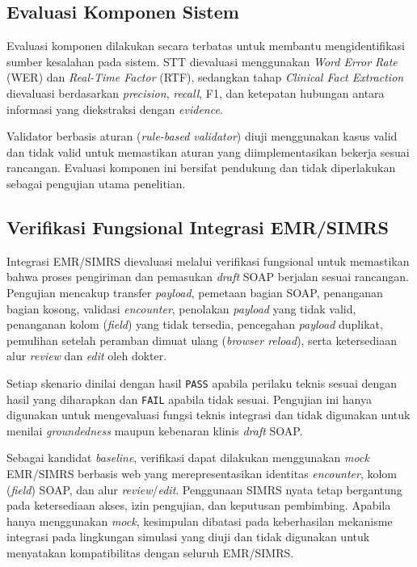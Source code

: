 \subsection{Evaluasi Komponen Sistem}
\label{subsec:evaluasikomponen}

Evaluasi komponen dilakukan secara terbatas untuk membantu mengidentifikasi sumber kesalahan pada sistem. STT dievaluasi menggunakan \emph{Word Error Rate} (WER) dan \emph{Real-Time Factor} (RTF), sedangkan tahap \emph{Clinical Fact Extraction} dievaluasi berdasarkan \emph{precision}, \emph{recall}, F1, dan ketepatan hubungan antara informasi yang diekstraksi dengan \emph{evidence}.

Validator berbasis aturan (\emph{rule-based validator}) diuji menggunakan kasus valid dan tidak valid untuk memastikan aturan yang diimplementasikan bekerja sesuai rancangan. Evaluasi komponen ini bersifat pendukung dan tidak diperlakukan sebagai pengujian utama penelitian.

\subsection{Verifikasi Fungsional Integrasi EMR/SIMRS}
\label{subsec:verifikasifungsional}

Integrasi EMR/SIMRS dievaluasi melalui verifikasi fungsional untuk memastikan bahwa proses pengiriman dan pemasukan \emph{draft} SOAP berjalan sesuai rancangan. Pengujian mencakup transfer \emph{payload}, pemetaan bagian SOAP, penanganan bagian kosong, validasi \emph{encounter}, penolakan \emph{payload} yang tidak valid, penanganan kolom (\emph{field}) yang tidak tersedia, pencegahan \emph{payload} duplikat, pemulihan setelah peramban dimuat ulang (\emph{browser reload}), serta ketersediaan alur \emph{review} dan \emph{edit} oleh dokter.

Setiap skenario dinilai dengan hasil \texttt{PASS} apabila perilaku teknis sesuai dengan hasil yang diharapkan dan \texttt{FAIL} apabila tidak sesuai. Pengujian ini hanya digunakan untuk mengevaluasi fungsi teknis integrasi dan tidak digunakan untuk menilai \emph{groundedness} maupun kebenaran klinis \emph{draft} SOAP.

Sebagai kandidat \emph{baseline}, verifikasi dapat dilakukan menggunakan \emph{mock} EMR/SIMRS berbasis web yang merepresentasikan identitas \emph{encounter}, kolom (\emph{field}) SOAP, dan alur \emph{review}/\emph{edit}. Penggunaan SIMRS nyata tetap bergantung pada ketersediaan akses, izin pengujian, dan keputusan pembimbing. Apabila hanya menggunakan \emph{mock}, kesimpulan dibatasi pada keberhasilan mekanisme integrasi pada lingkungan simulasi yang diuji dan tidak digunakan untuk menyatakan kompatibilitas dengan seluruh EMR/SIMRS.

